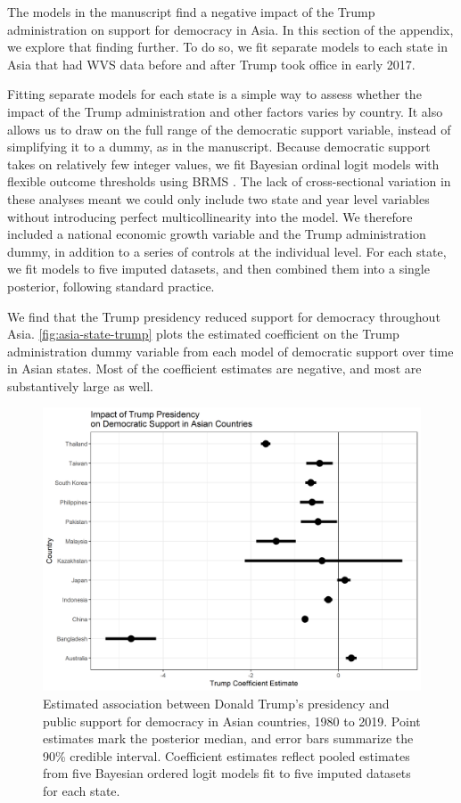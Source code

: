 \documentclass[12pt]{article}
\begin{document}
The models in the manuscript find a negative impact of the Trump administration on support for democracy in Asia. 
In this section of the appendix, we explore that finding further. 
To do so, we fit separate models to each state in Asia that had WVS data before and after Trump took office in early 2017. 


Fitting separate models for each state is a simple way to assess whether the impact of the Trump administration and other factors varies by country. 
It also allows us to draw on the full range of the democratic support variable, instead of simplifying it to a dummy, as in the manuscript. 
Because democratic support takes on relatively few integer values, we fit Bayesian ordinal logit models with flexible outcome thresholds using BRMS \citep{Buerkner2017}.
The lack of cross-sectional variation in these analyses meant we could only include two state and year level variables without introducing perfect multicollinearity into the model. 
We therefore included a national economic growth variable and the Trump administration dummy, in addition to a series of controls at the individual level. 
For each state, we fit models to five imputed datasets, and then combined them into a single posterior, following standard practice. 


We find that the Trump presidency reduced support for democracy throughout Asia. 
\autoref{fig:asia-state-trump} plots the estimated coefficient on the Trump administration dummy variable from each model of democratic support over time in Asian states. 
Most of the coefficient estimates are negative, and most are substantively large as well. 


\begin{figure}
\includegraphics[width = .95\textwidth]{asia-state-trump.png}
\caption{Estimated association between Donald Trump's presidency and public support for democracy in Asian countries, 1980 to 2019. Point estimates mark the posterior median, and error bars summarize the 90\% credible interval. Coefficient estimates reflect pooled estimates from five Bayesian ordered logit models fit to five imputed datasets for each state.}
\label{fig:asia-state-trump} 
\end{figure}
\end{document}
